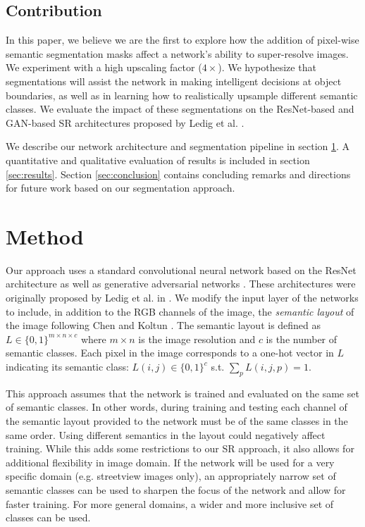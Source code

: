\documentclass[10pt,twocolumn,letterpaper]{article}
\begin{document}
\subsection{Contribution}
In this paper, we believe we are the first to explore how the addition of
pixel-wise semantic segmentation masks affect a network's ability to
super-resolve images. We experiment with a high upscaling factor ($4 \times$).
We hypothesize that segmentations will assist the network in making intelligent
decisions at object boundaries, as well as in learning how to realistically
upsample different semantic classes. We evaluate the impact of these
segmentations on the ResNet-based and GAN-based SR architectures proposed by
Ledig et al. \cite{SRGAN}.

We describe our network architecture and segmentation pipeline in section
\ref{sec:method}. A quantitative and qualitative evaluation of results is
included in section \ref{sec:results}. Section \ref{sec:conclusion} contains
concluding remarks and directions for future work based on our segmentation
approach.


\section{Method}
\label{sec:method}

Our approach uses a standard convolutional neural network based on the ResNet
architecture \cite{ResNet} as well as generative adversarial networks
\cite{GAN}. These architectures were originally proposed by Ledig et al. in
\cite{SRGAN}. We modify the input layer of the networks to include, in addition
to the RGB channels of the image, the \textit{semantic layout} of the image
following Chen and Koltun \cite{ImageSynthesis}. The semantic layout is defined
as $L \in \{0, 1\}^{m \times n \times c}$ where $m \times n$ is the image
resolution and $c$ is the number of semantic classes. Each pixel in the image
corresponds to a one-hot vector in $L$ indicating its semantic class: $L(i, j)
\in \{0, 1\}^c$ s.t. $\sum_p L(i, j, p) = 1$.

This approach assumes that the network is trained and evaluated on the same set
of semantic classes. In other words, during training and testing each channel
of the semantic layout provided to the network must be of the same classes in
the same order. Using different semantics in the layout could negatively affect
training. While this adds some restrictions to our SR approach, it also allows
for additional flexibility in image domain. If the network will be used for a
very specific domain (e.g. streetview images only), an appropriately narrow set
of semantic classes can be used to sharpen the focus of the network and allow
for faster training. For more general domains, a wider and more inclusive set
of classes can be used.
\end{document}
